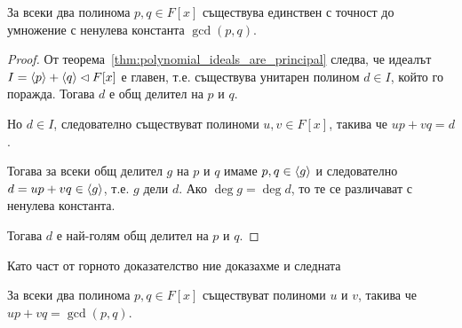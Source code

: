 \documentclass[numbers=endperiod, bibliography=totocnumbered]{scrartcl}
\begin{document}
\begin{theorem}
  За всеки два полинома \( p, q \in F[x] \) съществува единствен с точност до умножение с ненулева константа \( \gcd(p, q) \).
\end{theorem}
\begin{proof}
  От теорема~\ref{thm:polynomial_ideals_are_principal} следва, че идеалът \( I = \left\langle p \right\rangle + \left\langle q \right\rangle \lhd F[x] \) е главен, т.е. съществува унитарен полином \( d \in I \), който го поражда.
  Тогава \( d \) е общ делител на \( p \) и \( q \).

  Но \( d \in I \), следователно съществуват полиноми \( u, v \in F[x] \), такива че \( u p + v q = d \).

  Тогава за всеки общ делител \( g \) на \( p \) и \( q \) имаме \( p, q \in \left\langle g \right\rangle \) и следователно \( d = u p + v q \in \left\langle g \right\rangle \), т.е. \( g \) дели \( d \). Ако \( \deg g = \deg d \), то те се различават с ненулева константа.

  Тогава \( d \) е най-голям общ делител на \( p \) и \( q \).
\end{proof}

Като част от горното доказателство ние доказахме и следната
\begin{theorem}
  За всеки два полинома \( p, q \in F[x] \) съществуват полиноми \( u \) и \( v \), такива че \( u p + v q = \gcd(p, q) \).
\end{theorem}
\end{document}

